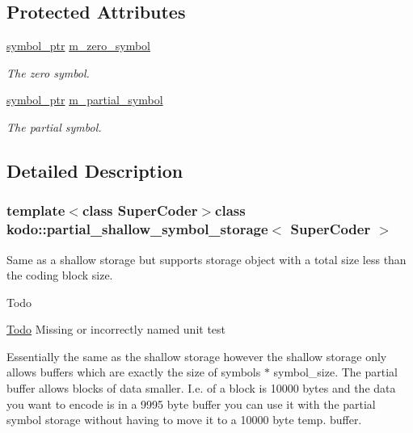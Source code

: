 \subsection*{Protected Attributes}
\begin{DoxyCompactItemize}
\item 
\hypertarget{classkodo_1_1partial__shallow__symbol__storage_af73dbeaa0b5eb0d9928707455eb2002c}{\hyperlink{classkodo_1_1partial__shallow__symbol__storage_acee6b5408cfc5bd21794e750bc3d9950}{symbol\-\_\-ptr} \hyperlink{classkodo_1_1partial__shallow__symbol__storage_af73dbeaa0b5eb0d9928707455eb2002c}{m\-\_\-zero\-\_\-symbol}}\label{classkodo_1_1partial__shallow__symbol__storage_af73dbeaa0b5eb0d9928707455eb2002c}

\begin{DoxyCompactList}\small\item\em The zero symbol. \end{DoxyCompactList}\item 
\hypertarget{classkodo_1_1partial__shallow__symbol__storage_aef5890731c4a15807cefaa0e959886c0}{\hyperlink{classkodo_1_1partial__shallow__symbol__storage_acee6b5408cfc5bd21794e750bc3d9950}{symbol\-\_\-ptr} \hyperlink{classkodo_1_1partial__shallow__symbol__storage_aef5890731c4a15807cefaa0e959886c0}{m\-\_\-partial\-\_\-symbol}}\label{classkodo_1_1partial__shallow__symbol__storage_aef5890731c4a15807cefaa0e959886c0}

\begin{DoxyCompactList}\small\item\em The partial symbol. \end{DoxyCompactList}\end{DoxyCompactItemize}


\subsection{Detailed Description}
\subsubsection*{template$<$class Super\-Coder$>$class kodo\-::partial\-\_\-shallow\-\_\-symbol\-\_\-storage$<$ Super\-Coder $>$}

Same as a shallow storage but supports storage object with a total size less than the coding block size. 

\begin{DoxyRefDesc}{Todo}
\item[\hyperlink{todo__todo000031}{Todo}]Missing or incorrectly named unit test\end{DoxyRefDesc}
Essentially the same as the shallow storage however the shallow storage only allows buffers which are exactly the size of symbols $\ast$ symbol\-\_\-size. The partial buffer allows blocks of data smaller. I.\-e. of a block is 10000 bytes and the data you want to encode is in a 9995 byte buffer you can use it with the partial symbol storage without having to move it to a 10000 byte temp. buffer. 

